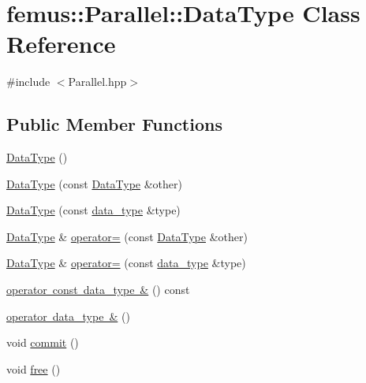 \hypertarget{classfemus_1_1_parallel_1_1_data_type}{}\section{femus\+:\+:Parallel\+:\+:Data\+Type Class Reference}
\label{classfemus_1_1_parallel_1_1_data_type}


{\ttfamily \#include $<$Parallel.\+hpp$>$}

\subsection*{Public Member Functions}
\begin{DoxyCompactItemize}
\item 
\mbox{\hyperlink{classfemus_1_1_parallel_1_1_data_type_ad7d3855bcf770d642341dfd489d45566}{Data\+Type}} ()
\item 
\mbox{\hyperlink{classfemus_1_1_parallel_1_1_data_type_a044ca795966474708cfb05873a5b4d3e}{Data\+Type}} (const \mbox{\hyperlink{classfemus_1_1_parallel_1_1_data_type}{Data\+Type}} \&other)
\item 
\mbox{\hyperlink{classfemus_1_1_parallel_1_1_data_type_a50da5017a2c115ac114325da295f8d4b}{Data\+Type}} (const \mbox{\hyperlink{structfemus_1_1_parallel_1_1data__type}{data\+\_\+type}} \&type)
\item 
\mbox{\hyperlink{classfemus_1_1_parallel_1_1_data_type}{Data\+Type}} \& \mbox{\hyperlink{classfemus_1_1_parallel_1_1_data_type_abe3ac0e3773f8cf27a51709334f2734e}{operator=}} (const \mbox{\hyperlink{classfemus_1_1_parallel_1_1_data_type}{Data\+Type}} \&other)
\item 
\mbox{\hyperlink{classfemus_1_1_parallel_1_1_data_type}{Data\+Type}} \& \mbox{\hyperlink{classfemus_1_1_parallel_1_1_data_type_ae740008e90c5043d963e272f8851cbfb}{operator=}} (const \mbox{\hyperlink{structfemus_1_1_parallel_1_1data__type}{data\+\_\+type}} \&type)
\item 
\mbox{\hyperlink{classfemus_1_1_parallel_1_1_data_type_af4e34684c0c465de50f13b77bea8b2ad}{operator const data\+\_\+type \&}} () const
\item 
\mbox{\hyperlink{classfemus_1_1_parallel_1_1_data_type_a6d58e672f68f3aec26f2520de6b0654d}{operator data\+\_\+type \&}} ()
\item 
void \mbox{\hyperlink{classfemus_1_1_parallel_1_1_data_type_a2d52a59843b2ff147cb6fefed99cb923}{commit}} ()
\item 
void \mbox{\hyperlink{classfemus_1_1_parallel_1_1_data_type_ae9b6a2d0c9ff9103575477b412aaf991}{free}} ()
\end{DoxyCompactItemize}


